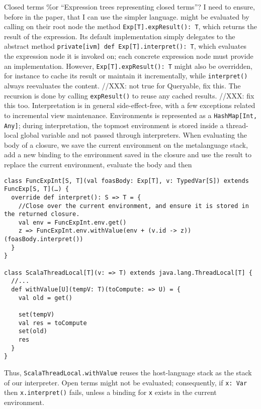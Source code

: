 \documentclass[preprint,authoryear,10pt]{sigplanconf}
\begin{document}
Closed terms \%or ``Expression trees representing closed terms''? I need
to ensure, before in the paper, that I can use the simpler language.
might be evaluated by calling on their root node the method
\texttt{Exp{[}T{]}.expResult(): T}, which returns the result of the
expression. Its default implementation simply delegates to the abstract
method \texttt{private{[}ivm{]} def Exp{[}T{]}.interpret(): T}, which
evaluates the expression node it is invoked on; each concrete expression
node must provide an implementation. However,
\texttt{Exp{[}T{]}.expResult(): T} might also be overridden, for
instance to cache its result or maintain it incrementally, while
\texttt{interpret()} always reevaluates the content. //XXX: not true for
Queryable, fix this. The recursion is done by calling
\texttt{expResult()} to reuse any cached results. //XXX: fix this too.
Interpretation is in general side-effect-free, with a few exceptions
related to incremental view maintenance. Environments is represented as
a \texttt{HashMap{[}Int, Any{]}}; during interpretation, the topmost
environment is stored inside a thread-local global variable and not
passed through interpreters. When evaluating the body of a closure, we
save the current environment on the metalanguage stack, add a new
binding to the environment saved in the closure and use the result to
replace the current environment, evaluate the body and then

\begin{lstlisting}
class FuncExpInt[S, T](val foasBody: Exp[T], v: TypedVar[S]) extends FuncExp[S, T](…) {
  override def interpret(): S => T = {
    //Close over the current environment, and ensure it is stored in the returned closure.
    val env = FuncExpInt.env.get()
    z => FuncExpInt.env.withValue(env + (v.id -> z))(foasBody.interpret())
  }
}

class ScalaThreadLocal[T](v: => T) extends java.lang.ThreadLocal[T] {
  //...
  def withValue[U](tempV: T)(toCompute: => U) = {
    val old = get()

    set(tempV)
    val res = toCompute
    set(old)
    res
  }
}
\end{lstlisting}
Thus,
\texttt{ScalaThreadLocal.withValue} reuses the host-language stack as
the stack of our interpreter. Open terms might not be evaluated;
consequently, if \texttt{x: Var} then \texttt{x.interpret()} fails,
unless a binding for \texttt{x} exists in the current environment.
\end{document}
